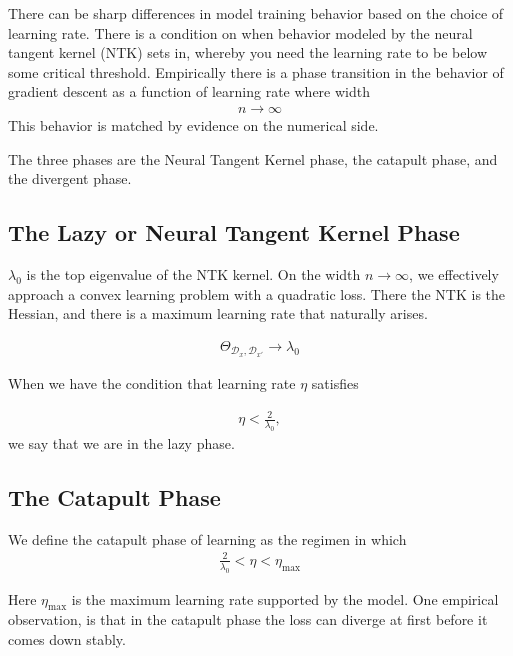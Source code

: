\documentclass[book.tex]{subfiles}
\begin{document}
There can be sharp differences in model training behavior based on the choice of learning rate. There is a condition on when behavior modeled by the neural tangent kernel (NTK) sets in, whereby you need the learning rate to be below some critical threshold. 
Empirically there is a phase transition in the behavior of gradient descent as a function of learning rate where width \begin{align}n \to \infty\end{align} 
This behavior is matched by evidence on the numerical side.

The three phases are the Neural Tangent Kernel phase, the catapult phase, and the divergent phase.

\subsection{The Lazy or Neural Tangent Kernel Phase}

$\lambda_0$ is the top eigenvalue of the NTK kernel. On the width $n \to \infty$, we effectively approach a convex learning problem with a quadratic loss. There the NTK is the Hessian, and there is a maximum learning rate that naturally arises. 

\begin{align}
\Theta_{\mathcal{D}_x, \mathcal{D}_{x'}} \to \lambda_0
\end{align}

When we have the condition that learning rate $\eta$ satisfies

\begin{align}
    \eta < \frac{2}{\lambda_0},
\end{align}
we say that we are in the lazy phase.


\subsection{The Catapult Phase}

We define the catapult phase of learning as the regimen in which
\begin{align}
    \frac{2}{\lambda_0} < \eta < \eta_{\mathrm{max}}
\end{align}

Here $\eta_{\mathrm{max}}$ is the maximum learning rate supported by the model. One empirical observation, is that in the catapult phase the loss can diverge at first before it comes down stably. 
\end{document}
